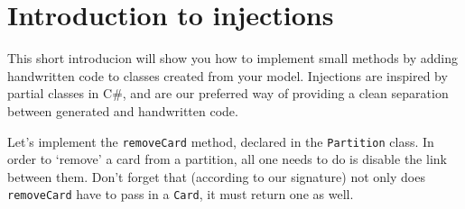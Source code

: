 \newpage
\section{Introduction to injections}
\genHeader
\hypertarget{sec:injections common}{}

This short introducion will show you how to implement small methods by adding handwritten code to classes created from your model. Injections are inspired by
partial classes in C\#, and are our preferred way of providing a clean separation between generated and handwritten code. 

Let's implement the \texttt{removeCard} method, declared in the \texttt{Partition} class. In order to `remove' a card from a partition, all one needs to do is
disable the link between them. Don't forget that (according to our signature) not only does \texttt{removeCard} have to pass in a \texttt{Card}, it must return
one as well.

